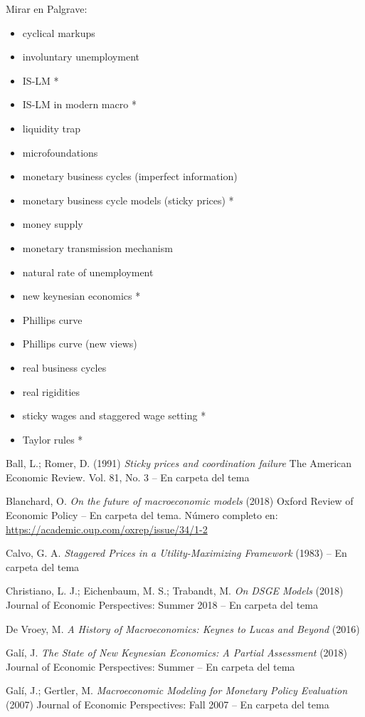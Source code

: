 \documentclass{nuevotema}
\begin{document}
Mirar en Palgrave:
\begin{itemize}
	\item cyclical markups
	\item involuntary unemployment
	\item IS-LM *
	\item IS-LM in modern macro *
	\item liquidity trap
	\item microfoundations
	\item monetary business cycles (imperfect information) 
	\item monetary business cycle models (sticky prices) *
	\item money supply
	\item monetary transmission mechanism
	\item natural rate of unemployment
	\item new keynesian economics *
	\item Phillips curve
	\item Phillips curve (new views)
	\item real business cycles
	\item real rigidities
	\item sticky wages and staggered wage setting *
	\item Taylor rules *
\end{itemize}

Ball, L.; Romer, D. (1991) \textit{Sticky prices and coordination failure} The American Economic Review. Vol. 81, No. 3 -- En carpeta del tema

Blanchard, O. \textit{On the future of macroeconomic models} (2018) Oxford Review of Economic Policy -- En carpeta del tema. Número completo en: \url{https://academic.oup.com/oxrep/issue/34/1-2}

Calvo, G. A. \textit{Staggered Prices in a Utility-Maximizing Framework} (1983) -- En carpeta del tema

Christiano, L. J.; Eichenbaum, M. S.; Trabandt, M. \textit{On DSGE Models} (2018) Journal of Economic Perspectives: Summer 2018 -- En carpeta del tema

De Vroey, M. \textit{A History of Macroeconomics: Keynes to Lucas and Beyond} (2016)

Galí, J. \textit{The State of New Keynesian Economics: A Partial Assessment} (2018) Journal of Economic Perspectives: Summer -- En carpeta del tema

Galí, J.; Gertler, M. \textit{Macroeconomic Modeling for Monetary Policy Evaluation} (2007) Journal of Economic Perspectives: Fall 2007 -- En carpeta del tema
\end{document}
